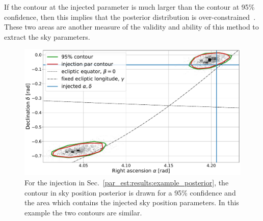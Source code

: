 If the contour at the injected parameter is much larger than the contour at 95\%
confidence, then this implies that the posterior distribution is over-constrained~.  These two areas are another measure of the validity and ability of this
method to extract the sky parameters. 
%
\begin{figure}[ht]
    \centering
    \includegraphics[width=\linewidth]{C5_parameter/skyarea_example.pdf}
    \caption[Area of sky at 95\% confidence]{For the injection in
Sec.~\ref{par_est:results:example_posterior}, the contour in sky position
posterior is drawn for a 95\% confidence and the area which contains the
injected sky position parameters. In this example the two contours are
similar.} \label{par_est:results:sky_area_example}
\end{figure}

